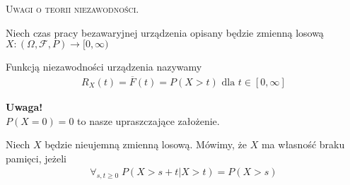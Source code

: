 \begin{center}
\textsc{Uwagi o teorii niezawodności.}
\end{center}
Niech czas pracy bezawaryjnej urządzenia opisany będzie zmienną losową $ X:(\Omega,\mathcal F ,P)\to[0,\infty ) $
\begin{defi}Funkcją niezawodności urządzenia nazywamy
\begin{gather*}
R_X(t)=\overline{F}(t)=P\left(X>t\right)\text{ dla }t\in[0,\infty ]
\end{gather*}
\end{defi}

\textbf{Uwaga!}\\
$ P\left(X=0\right) =0$ to nasze upraszczające założenie.
\begin{defi}
Niech $ X $ będzie nieujemną zmienną losową. Mówimy, że $ X $  ma własność braku pamięci, jeżeli
\begin{gather*}
\forall_{s,t\ge0}\;P\left(X>s+t|X>t\right)=P\left(X>s\right)
\end{gather*}
\end{defi}

